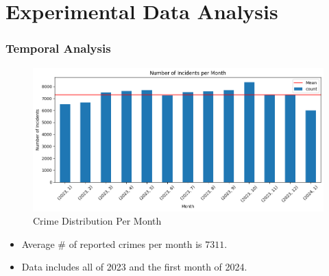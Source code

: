 \documentclass{beamer}
\begin{document}


\section{Experimental Data Analysis}
\begin{frame}
    \frametitle{Temporal Analysis}
    \begin{minipage}[c]{0.7\textwidth}
        \begin{figure}
            \centering
            \includegraphics[width=\linewidth]{Figures/Number of Incidents Per Month.png}
            \caption{Crime Distribution Per Month}
        \end{figure}
    \end{minipage}\hfill
    \begin{minipage}[c]{0.3\textwidth}
        {\scriptsize %
            \begin{itemize}
                \item Average \# of reported crimes per month is $7311$.
                \item Data includes all of 2023 and the first month of 2024.
            \end{itemize}
        }
    \end{minipage}

\end{frame}
\end{document}
